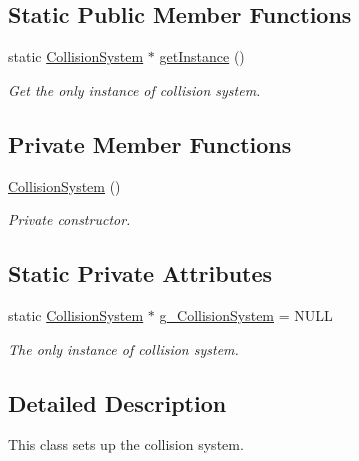 \subsection*{Static Public Member Functions}
\begin{DoxyCompactItemize}
\item 
\mbox{\label{class_collision_system_a3d25c8c12b0e1788a181c7efaf3763e2}} 
static \mbox{\hyperlink{class_collision_system}{Collision\+System}} $\ast$ \mbox{\hyperlink{class_collision_system_a3d25c8c12b0e1788a181c7efaf3763e2}{get\+Instance}} ()
\begin{DoxyCompactList}\small\item\em Get the only instance of collision system. \end{DoxyCompactList}\end{DoxyCompactItemize}
\subsection*{Private Member Functions}
\begin{DoxyCompactItemize}
\item 
\mbox{\hyperlink{class_collision_system_ac8b1ff32bb9c9ff3e765c2b334713454}{Collision\+System}} ()
\begin{DoxyCompactList}\small\item\em Private constructor. \end{DoxyCompactList}\end{DoxyCompactItemize}
\subsection*{Static Private Attributes}
\begin{DoxyCompactItemize}
\item 
\mbox{\label{class_collision_system_a19ad5712e387187c9198df38d78c140b}} 
static \mbox{\hyperlink{class_collision_system}{Collision\+System}} $\ast$ \mbox{\hyperlink{class_collision_system_a19ad5712e387187c9198df38d78c140b}{g\+\_\+\+Collision\+System}} = N\+U\+LL
\begin{DoxyCompactList}\small\item\em The only instance of collision system. \end{DoxyCompactList}\end{DoxyCompactItemize}


\subsection{Detailed Description}
This class sets up the collision system. 

